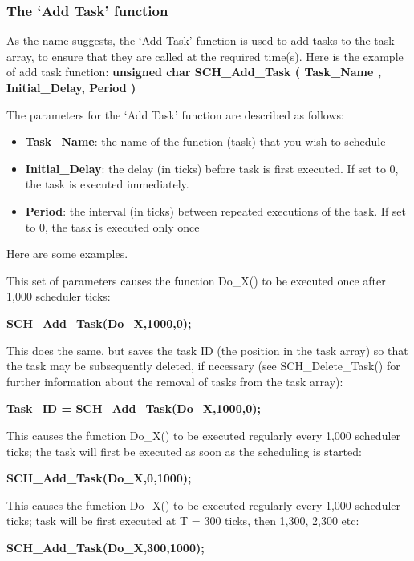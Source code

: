 \subsubsection{The ‘Add Task’ function}
As the name suggests, the ‘Add Task’ function is used to add tasks to the task array, to
ensure that they are called at the required time(s).
Here is the example of add task function: 
\textbf{unsigned   char   SCH\_Add\_Task ( Task\_Name  , Initial\_Delay, Period )}

The parameters for the ‘Add Task’ function are described as follows:
\begin{itemize}
    \item \textbf{Task\_Name}: the name of the function (task) that you wish to schedule 
    \item \textbf{Initial\_Delay}: the delay (in ticks) before task is first executed. If set to 0,
the task is executed immediately.
    \item \textbf{Period}: the interval (in ticks) between repeated executions of the task. If set to 0, the task is executed only once
    
\end{itemize}

Here are some examples.

This set of parameters causes the function Do\_X() to be executed once after 1,000
scheduler ticks:

\textbf{SCH\_Add\_Task(Do\_X,1000,0);}

This does the same, but saves the task ID (the position in the task array) so that the
task may be subsequently deleted, if necessary (see SCH\_Delete\_Task() for further
information about the removal of tasks from the task array):

\textbf{Task\_ID = SCH\_Add\_Task(Do\_X,1000,0);}

This causes the function Do\_X() to be executed regularly every 1,000 scheduler ticks;
the task will first be executed as soon as the scheduling is started:


\textbf{SCH\_Add\_Task(Do\_X,0,1000);}

This causes the function Do\_X() to be executed regularly every 1,000 scheduler
ticks; task will be first executed at T = 300 ticks, then 1,300, 2,300 etc:

\textbf{SCH\_Add\_Task(Do\_X,300,1000);}

